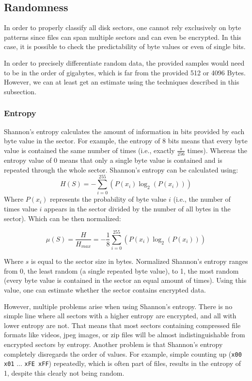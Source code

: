 \documentclass[
  digital, %
  oneside, %
  lof,     %
  lot,     %
]{fithesis4}
\begin{document}
\subsection{Randomness}
In order to properly classify all disk sectors, one cannot rely exclusively on byte patterns since files can span multiple sectors and can even be encrypted.
In this case, it is possible to check the predictability of byte values or even of single bits.

In order to precisely differentiate random data, the provided samples would need to be in the order of gigabytes, which is far from the provided 512 or 4096 Bytes.
However, we can at least get an estimate using the techniques described in this subsection.

\subsubsection{Entropy}
\label{sss:entropy}
Shannon's entropy calculates the amount of information in bits provided by each byte value in the sector.\cite{shannon48}
For example, the entropy of 8 bits means that every byte value is contained the same number of times (i.e., exactly $\frac{s}{256}$ times).
Whereas the entropy value of 0 means that only a single byte value is contained and is repeated through the whole sector. Shannon's entropy can be calculated using:
$$H(S) = -\sum_{i=0}^{255}(P(x_i)\log_2(P(x_i)))$$
Where $P(x_i)$ represents the probability of byte value $i$ (i.e., the number of times value $i$ appears in the sector divided by the number of all bytes in the sector). Which can be then normalized:

$$\mu (S) = \frac{H}{H_{max}} = -\frac{1}{8}\sum_{i=0}^{255}(P(x_i)\log_2(P(x_i)))$$

Where $s$ is equal to the sector size in bytes.
Normalized Shannon's entropy ranges from 0, the least random (a single repeated byte value), to 1, the most random (every byte value is contained in the sector an equal amount of times).
Using this value, one can estimate whether the sector contains encrypted data. 

However,  multiple problems arise when using Shannon's entropy.
There is no simple line where all sectors with a higher entropy are encrypted, and all with lower entropy are not.
That means that most sectors containing compressed file formats like videos, jpeg images, or zip files will be almost indistinguishable from encrypted sectors by entropy.
Another problem is that Shannon's entropy completely disregards the order of values.
For example, simple counting up (\texttt{x00 x01} ... \texttt{xFE xFF}) repeatedly, which is often part of files, results in the entropy of 1, despite this clearly not being random. 
\end{document}
